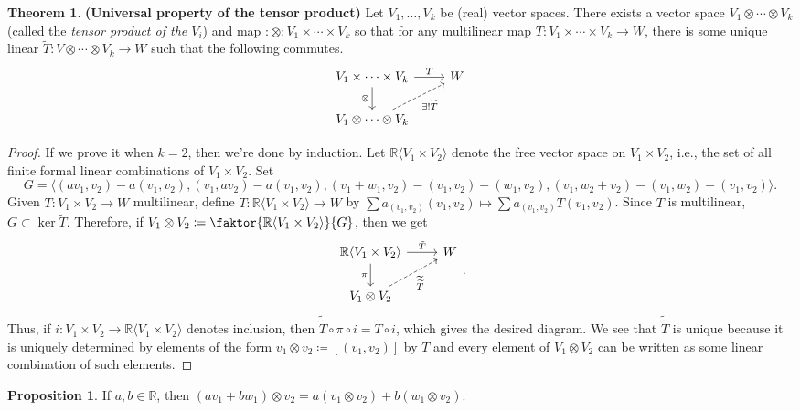 \documentclass[10pt,letterpaper,cm]{nupset}
\theoremstyle{definition}
\newtheorem{theorem}{Theorem}
\newtheorem{prop}{Proposition}
\newcommand{\R}{\mathbb R}
\newcommand{\1}{\mathbf{1}}
\newcommand{\0}{\vec 0}
\begin{document}
\begin{theorem}{\textbf{(Universal property of the tensor product)}}
Let $V_1, \ldots, V_k$ be (real) vector spaces. There exists a vector space $V_1 \otimes \cdots \otimes V_k$ (called the \textit{tensor product of the $V_i$}) and map $:\otimes : V_1\times \cdots \times V_k$ so that for any multilinear map $T: V_1 \times \cdots \times V_k \to W$, there is some unique linear $\widetilde{T} : V \otimes \cdots \otimes V_k \to W$ such that the following commutes.
\[
\begin{tikzcd}
V_1 \times \cdots \times V_k \arrow[d, "\otimes"'] \arrow[r, "T"] & W \\
V_1 \otimes \cdots \otimes V_k \arrow[ru, "\exists! \widetilde{T}"', dashed] & 
\end{tikzcd}
\]
\end{theorem}
\begin{proof}
If we prove it when $k=2$, then we're done by induction. Let $\R\langle V_1 \times V_2 \rangle$ denote the free vector space on $V_1 \times V_2$, i.e., the set of all finite formal linear combinations of $V_1 \times V_2$. Set $$G = \langle (av_1, v_2) - a(v_1, v_2), (v_1, av_2) - a(v_1, v_2), (v_1 + w_1, v_2) - (v_1, v_2)-(w_1, v_2), (v_1, w_2 + v_2) - (v_1, w_2) -(v_1, v_2)\rangle.$$
Given $T: V_1 \times V_2 \to W$ multilinear, define $\widetilde{T} : \R\langle V_1 \times V_2\rangle \to W$ by $\sum a_{(v_1, v_2)}(v_1, v_2) \mapsto \sum a_{(v_1, v_2)} T(v_1, v_2)$. Since $T$ is multilinear, $G \subset \ker \widetilde{T}$. Therefore, if $V_1 \otimes V_2 \coloneqq  \faktor{\R\langle V_1 \times V_2 \rangle}{G}$, then we get 
\[
\begin{tikzcd}
\R\langle V_1 \times V_2 \rangle \arrow[d, "\pi"'] \arrow[r, "\tilde{T}"] & W \\
V_1 \otimes V_2 \arrow[ru, "\widetilde{\widetilde{T}}"', dashed] & 
\end{tikzcd}.
\]
Thus, if $i: V_1 \times V_2 \to \R\langle V_1 \times V_2 \rangle$ denotes inclusion, then $\widetilde{\widetilde{T}} \circ \pi \circ i = \widetilde{T} \circ i$, which gives the desired diagram. We see that $\widetilde{\widetilde{T}}$ is unique because it is uniquely determined by elements of the form $v_1 \otimes v_2\coloneqq  [(v_1, v_2)]$ by $T$ and every element of $V_1 \otimes V_2$ can be written as some linear combination of such elements.
\end{proof}

\begin{prop}
If $a,b \in \R$, then $(av_1 + bw_1) \otimes v_2 = a(v_1 \otimes v_2) + b(w_1 \otimes v_2)$.
\end{prop}
\end{document}
